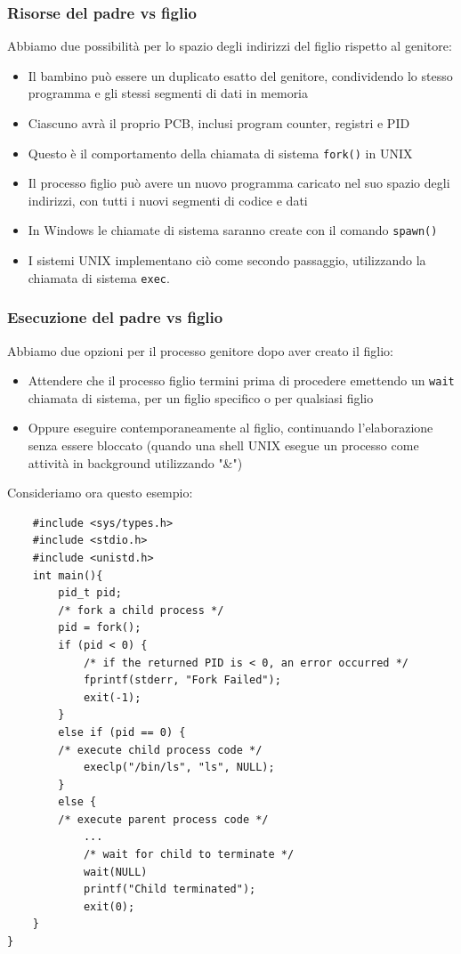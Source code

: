 \documentclass{article}
\begin{document}
\subsubsection{Risorse del padre vs figlio}
Abbiamo due possibilità per lo spazio degli indirizzi del figlio rispetto al genitore:
\begin{itemize}
    \item Il bambino può essere un duplicato esatto del genitore, condividendo lo stesso programma e gli stessi segmenti di dati in memoria
    \item Ciascuno avrà il proprio PCB, inclusi program counter, registri e PID 
    \item Questo è il comportamento della chiamata di sistema \texttt{fork()} in UNIX
    \item Il processo figlio può avere un nuovo programma caricato nel suo spazio degli indirizzi, con tutti i nuovi segmenti di codice e dati
    \item In Windows le chiamate di sistema saranno create con il comando \texttt{spawn()} 
    \item I sistemi UNIX implementano ciò come secondo passaggio, utilizzando la chiamata di sistema \texttt{exec}.
\end{itemize}
\subsubsection{Esecuzione del padre vs figlio}
Abbiamo due opzioni per il processo genitore dopo aver creato il figlio:
\begin{itemize} 
    \item Attendere che il processo figlio termini prima di procedere emettendo un \texttt{wait} chiamata di sistema, per un figlio specifico o per qualsiasi figlio
    \item Oppure eseguire contemporaneamente al figlio, continuando l'elaborazione senza essere bloccato (quando una shell UNIX esegue un processo come attività in background utilizzando "\&")
\end{itemize}

Consideriamo ora questo esempio:
\begin{lstlisting}
    #include <sys/types.h>
    #include <stdio.h>
    #include <unistd.h>
    int main(){
        pid_t pid;
        /* fork a child process */
        pid = fork();
        if (pid < 0) { 
            /* if the returned PID is < 0, an error occurred */
            fprintf(stderr, "Fork Failed");
            exit(-1); 
        }
        else if (pid == 0) {
        /* execute child process code */
            execlp("/bin/ls", "ls", NULL);
        }
        else {
        /* execute parent process code */
            ...
            /* wait for child to terminate */
            wait(NULL)
            printf("Child terminated");
            exit(0); 
    }
}
\end{lstlisting}
\end{document}
